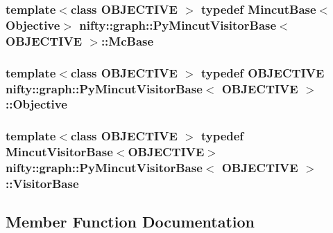 \subsubsection[{Mc\+Base}]{\setlength{\rightskip}{0pt plus 5cm}template$<$class O\+B\+J\+E\+C\+T\+I\+V\+E $>$ typedef {\bf Mincut\+Base}$<${\bf Objective}$>$ {\bf nifty\+::graph\+::\+Py\+Mincut\+Visitor\+Base}$<$ O\+B\+J\+E\+C\+T\+I\+V\+E $>$\+::{\bf Mc\+Base}}\label{classnifty_1_1graph_1_1PyMincutVisitorBase_a02d791718472f3448f70bb7a551ad29d}
\hypertarget{classnifty_1_1graph_1_1PyMincutVisitorBase_a169bf3e0d36a71b236d1355ec7f74218}{}
\subsubsection[{Objective}]{\setlength{\rightskip}{0pt plus 5cm}template$<$class O\+B\+J\+E\+C\+T\+I\+V\+E $>$ typedef O\+B\+J\+E\+C\+T\+I\+V\+E {\bf nifty\+::graph\+::\+Py\+Mincut\+Visitor\+Base}$<$ O\+B\+J\+E\+C\+T\+I\+V\+E $>$\+::{\bf Objective}}\label{classnifty_1_1graph_1_1PyMincutVisitorBase_a169bf3e0d36a71b236d1355ec7f74218}
\hypertarget{classnifty_1_1graph_1_1PyMincutVisitorBase_ae7a2c382bd05a78dfe61b046a6cd77c5}{}
\subsubsection[{Visitor\+Base}]{\setlength{\rightskip}{0pt plus 5cm}template$<$class O\+B\+J\+E\+C\+T\+I\+V\+E $>$ typedef {\bf Mincut\+Visitor\+Base}$<$O\+B\+J\+E\+C\+T\+I\+V\+E$>$ {\bf nifty\+::graph\+::\+Py\+Mincut\+Visitor\+Base}$<$ O\+B\+J\+E\+C\+T\+I\+V\+E $>$\+::{\bf Visitor\+Base}}\label{classnifty_1_1graph_1_1PyMincutVisitorBase_ae7a2c382bd05a78dfe61b046a6cd77c5}


\subsection{Member Function Documentation}
\hypertarget{classnifty_1_1graph_1_1PyMincutVisitorBase_ac55097eba5d5871a506d50ab892d1ea5}{}
